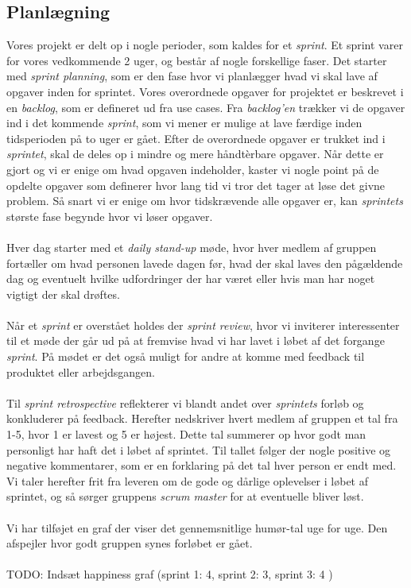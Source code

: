 \subsection{Planlægning}
Vores projekt er delt op i nogle perioder, som kaldes for et \textit{sprint}. Et sprint varer for vores vedkommende 2 uger, og består af nogle forskellige faser.
Det starter med \textit{sprint planning}, som er den fase hvor vi planlægger hvad vi skal lave af opgaver inden for sprintet. Vores overordnede opgaver for projektet er beskrevet i en \textit{backlog}, som er defineret ud fra use cases. Fra \textit{backlog'en} trækker vi de opgaver ind i det kommende \textit{sprint}, som vi mener er mulige at lave færdige inden tidsperioden på to uger er gået. Efter de overordnede opgaver er trukket ind i \textit{sprintet}, skal de deles op i mindre og mere håndtèrbare opgaver. Når dette er gjort og vi er enige om hvad opgaven indeholder, kaster vi nogle point på de opdelte opgaver som definerer hvor lang tid vi tror det tager at løse det givne problem. Så snart vi er enige om hvor tidskrævende alle opgaver er, kan \textit{sprintets} største fase begynde hvor vi løser opgaver.
\\\\
Hver dag starter med et \textit{daily stand-up} møde, hvor hver medlem af gruppen fortæller om hvad personen lavede dagen før, hvad der skal laves den pågældende dag og eventuelt hvilke udfordringer der har været eller hvis man har noget vigtigt der skal drøftes.
\\\\
Når et \textit{sprint} er overstået holdes der \textit{sprint review}, hvor vi inviterer interessenter til et møde der går ud på at fremvise hvad vi har lavet i løbet af det forgange \textit{sprint}. På mødet er det også muligt for andre at komme med feedback til produktet eller arbejdsgangen.
\\\\
Til \textit{sprint retrospective} reflekterer vi blandt andet over \textit{sprintets} forløb og konkluderer på feedback. Herefter nedskriver hvert medlem af gruppen et tal fra 1-5, hvor 1 er lavest og 5 er højest. Dette tal summerer op hvor godt man personligt har haft det i løbet af sprintet. Til tallet følger der nogle positive og negative kommentarer, som er en forklaring på det tal hver person er endt med. Vi taler herefter frit fra leveren om de gode og dårlige oplevelser i løbet af sprintet, og så sørger gruppens \textit{scrum master} for at eventuelle bliver løst.
\\\\
Vi har tilføjet en graf der viser det gennemsnitlige humør-tal uge for uge. Den afspejler hvor godt gruppen synes forløbet er gået.
\\\\
TODO: Indsæt happiness graf (sprint 1: 4, sprint 2: 3, sprint 3: 4 )
